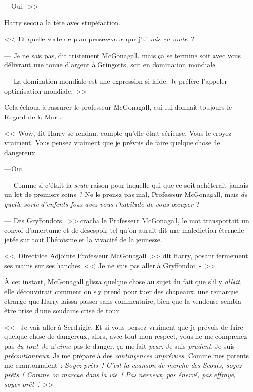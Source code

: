 ---Oui.~>>

Harry secoua la tête avec stupéfaction.

<<~Et quelle sorte de plan pensez-vous que j'ai \emph{mis} \emph{en route}~?

--- Je ne sais pas, dit tristement McGonagall, mais ça se termine soit avec vous délivrant une tonne d'argent à Gringotts, soit en domination mondiale.

--- La domination mondiale est une expression si laide. Je préfère l'appeler optimisation mondiale.~>>

Cela échoua à rassurer le professeur McGonagall, qui lui donnait toujours le Regard de la Mort.

<<~Wow, dit Harry se rendant compte qu'elle était sérieuse. Vous le croyez vraiment. Vous pensez vraiment que je prévois de faire quelque chose de dangereux.

---Oui.

--- Comme si c'était la \emph{seule} raison pour laquelle qui que ce soit achèterait jamais un kit de premiers soins~? Ne le prenez pas mal, Professeur McGonagall, mais \emph{de quelle sorte d'enfants fous avez-vous l'habitude de vous occuper}~?

--- Des Gryffondors,~>> cracha le Professeur McGonagall, le mot transportait un convoi d'amertume et de désespoir tel qu'on aurait dit une malédiction éternelle jetée sur tout l'héroïsme et la vivacité de la jeunesse.

<<~Directrice Adjointe Professeur McGonagall~>> dit Harry, posant fermement ses mains sur ses hanches. <<~Je ne vais pas aller à Gryffondor~-~>>

À cet instant, McGonagall glissa quelque chose au sujet du fait que s'il y \emph{allait}, elle découvrirait comment on s'y prend pour tuer des chapeaux, une remarque étrange que Harry laissa passer sans commentaire, bien que la vendeuse sembla être prise d'une soudaine crise de toux.

<<~ Je vais aller à Serdaigle. Et si vous pensez vraiment que je prévois de faire quelque chose de dangereux, alors, avec tout mon respect, vous ne me comprenez pas \emph{du tout}. Je n'\emph{aime} pas le danger, ça me fait \emph{peur}. Je suis \emph{prudent}. Je suis \emph{précautionneux}. Je me prépare à des \emph{contingences imprévues}. Comme mes parents me chantonnaient~: \emph{Soyez prêts~! C'est la chanson de marche des Scouts, soyez prêts~! Comme on marche dans la vie~! Pas nerveux, pas énervé, pas effrayé, soyez prêt~!}~>>

